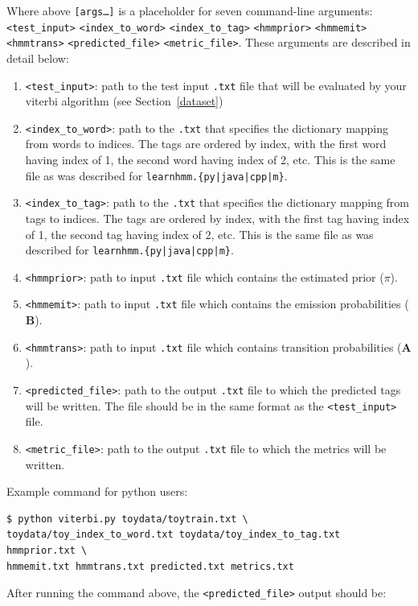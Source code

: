 \documentclass{article}
\begin{document}
Where above \texttt{[args\dots]} is a placeholder for seven command-line arguments:\texttt{<test\_input>} \texttt{<index\_to\_word>} \texttt{<index\_to\_tag>} \texttt{<hmmprior>} \texttt{<hmmemit>} \texttt{<hmmtrans>} \texttt{<predicted\_file>} \texttt{<metric\_file>}. These arguments are described in detail below:
\begin{enumerate}
    \item \texttt{<test\_input>}: path to the test input \texttt{.txt} file that will be evaluated by your viterbi algorithm (see Section~\ref{dataset})
    \item \texttt{<index\_to\_word>}: path to the \texttt{.txt} that specifies the dictionary mapping from words to indices. The tags are ordered by index, with the first word having index of 1, the second word having index of 2, etc. This is the same file as was described for \texttt{learnhmm.\{py|java|cpp|m\}}.
    \item \texttt{<index\_to\_tag>}: path to the \texttt{.txt} that specifies the dictionary mapping from tags to indices. The tags are ordered by index, with the first tag having index of 1, the second tag having index of 2, etc. This is the same file as was described for \texttt{learnhmm.\{py|java|cpp|m\}}.
    \item \texttt{<hmmprior>}: path to input \texttt{.txt} file which contains the estimated prior (\boldmath${\pi}$).
    \item \texttt{<hmmemit>}: path to input \texttt{.txt} file which contains the emission probabilities ($\mathbf B$).
    \item \texttt{<hmmtrans>}: path to input \texttt{.txt} file which contains transition probabilities ($\mathbf A$).
    \item \texttt{<predicted\_file>}: path to the output \texttt{.txt} file to which the predicted tags will be written. The file should be in the same format as the \texttt{<test\_input>} file. 
    \item \texttt{<metric\_file>}: path to the output \texttt{.txt} file to which the metrics will be written. 
\end{enumerate}


Example command for python users:
\begin{lstlisting}
$ python viterbi.py toydata/toytrain.txt \
toydata/toy_index_to_word.txt toydata/toy_index_to_tag.txt hmmprior.txt \
hmmemit.txt hmmtrans.txt predicted.txt metrics.txt
\end{lstlisting}

After running the command above, the \texttt{<predicted\_file>} output should be:
\end{document}
